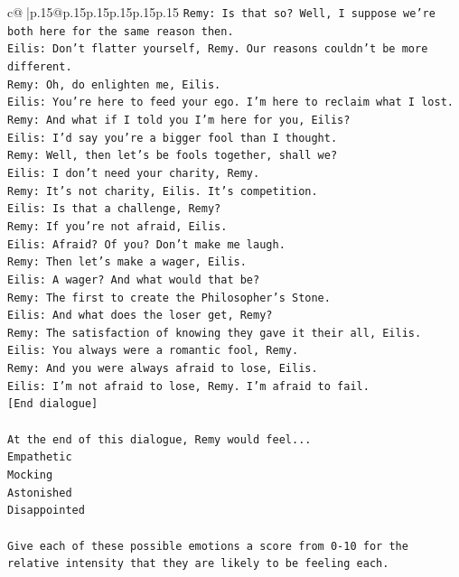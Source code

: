 \documentclass{article}
\begin{document}
{\begin{supertabular}{c@{$\;$}|p{.15\linewidth}@{}p{.15\linewidth}p{.15\linewidth}p{.15\linewidth}p{.15\linewidth}p{.15\linewidth}}
{{{\texttt{Remy: Is that so? Well, I suppose we're both here for the same reason then.} \\
\texttt{Eilis: Don't flatter yourself, Remy. Our reasons couldn't be more different.} \\
\texttt{Remy: Oh, do enlighten me, Eilis. } \\
\texttt{Eilis: You're here to feed your ego. I'm here to reclaim what I lost.} \\
\texttt{Remy: And what if I told you I'm here for you, Eilis?} \\
\texttt{Eilis: I'd say you're a bigger fool than I thought.} \\
\texttt{Remy: Well, then let's be fools together, shall we? } \\
\texttt{Eilis: I don't need your charity, Remy.} \\
\texttt{Remy: It's not charity, Eilis. It's competition. } \\
\texttt{Eilis: Is that a challenge, Remy?} \\
\texttt{Remy: If you're not afraid, Eilis.} \\
\texttt{Eilis: Afraid? Of you? Don't make me laugh.} \\
\texttt{Remy: Then let's make a wager, Eilis. } \\
\texttt{Eilis: A wager? And what would that be?} \\
\texttt{Remy: The first to create the Philosopher's Stone.} \\
\texttt{Eilis: And what does the loser get, Remy?} \\
\texttt{Remy: The satisfaction of knowing they gave it their all, Eilis.} \\
\texttt{Eilis: You always were a romantic fool, Remy.} \\
\texttt{Remy: And you were always afraid to lose, Eilis.} \\
\texttt{Eilis: I'm not afraid to lose, Remy. I'm afraid to fail.} \\
\texttt{{[}End dialogue{]}} \\
\\ 
\texttt{At the end of this dialogue, Remy would feel...} \\
\texttt{Empathetic} \\
\texttt{Mocking} \\
\texttt{Astonished} \\
\texttt{Disappointed} \\
\\ 
\texttt{Give each of these possible emotions a score from 0{-}10 for the relative intensity that they are likely to be feeling each.} \\
}}}
\end{supertabular}}
\end{document}
